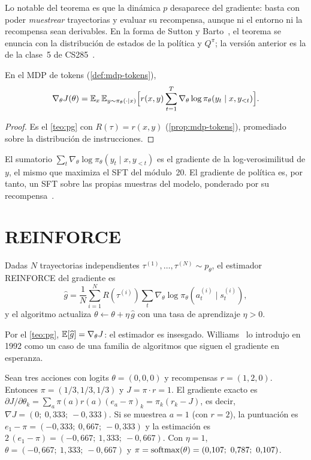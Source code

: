 Lo notable del teorema es que la dinámica $p$ desaparece del gradiente: basta con poder \emph{muestrear} trayectorias y evaluar su recompensa, aunque ni el entorno ni la recompensa sean derivables. En la forma de Sutton y Barto~\cite[§13.2]{sb}, el teorema se enuncia con la distribución de estados de la política y $Q^{\pi}$; la versión anterior es la de la clase~5 de CS285~\cite{cs285}.

\begin{corolario}\label{cor:pg-llm}
En el MDP de tokens (\cref{def:mdp-tokens}),
\[
\nabla_\theta J(\theta)=\mathbb{E}_{x}\,\mathbb{E}_{y\sim\pi_\theta(\cdot\mid x)}\Bigl[r(x,y)\sum_{t=1}^{T}\nabla_\theta\log\pi_\theta(y_t\mid x,y_{<t})\Bigr].
\]
\end{corolario}

\begin{proof}
Es el \cref{teo:pg} con $R(\tau)=r(x,y)$ (\cref{prop:mdp-tokens}), promediado sobre la distribución de instrucciones.
\end{proof}

El sumatorio $\sum_t\nabla_\theta\log\pi_\theta(y_t\mid x,y_{<t})$ es el gradiente de la log-verosimilitud de $y$, el mismo que maximiza el SFT del módulo~20. El gradiente de política es, por tanto, un SFT sobre las propias muestras del modelo, ponderado por su recompensa~\cite{cs336}.

\section{REINFORCE}

\begin{definicion}\label{def:reinforce}
Dadas $N$ trayectorias independientes $\tau^{(1)},\dots,\tau^{(N)}\sim p_\theta$, el estimador REINFORCE del gradiente es
\[
\widehat{g}=\frac1N\sum_{i=1}^{N}R(\tau^{(i)})\sum_{t}\nabla_\theta\log\pi_\theta(a^{(i)}_t\mid s^{(i)}_t),
\]
y el algoritmo actualiza $\theta\leftarrow\theta+\eta\,\widehat{g}$ con una tasa de aprendizaje $\eta>0$.
\end{definicion}

Por el \cref{teo:pg}, $\mathbb{E}[\widehat g]=\nabla_\theta J$: el estimador es insesgado. Williams~\cite{williams} lo introdujo en 1992 como un caso de una familia de algoritmos que siguen el gradiente en esperanza.

\begin{ejemplo}\label{ej:reinforce}
Sean tres acciones con logits $\theta=(0,0,0)$ y recompensas $r=(1,2,0)$. Entonces $\pi=(1/3,1/3,1/3)$ y $J=\pi\cdot r=1$. El gradiente exacto es $\partial J/\partial\theta_k=\sum_a\pi(a)r(a)(e_a-\pi)_k=\pi_k(r_k-J)$, es decir, $\nabla J=(0;\ 0{,}333;\ -0{,}333)$. Si se muestrea $a=1$ (con $r=2$), la puntuación es $e_1-\pi=(-0{,}333;\ 0{,}667;\ -0{,}333)$ y la estimación es $2\,(e_1-\pi)=(-0{,}667;\ 1{,}333;\ -0{,}667)$. Con $\eta=1$, $\theta=(-0{,}667;\ 1{,}333;\ -0{,}667)$ y $\pi=\softmax(\theta)=(0{,}107;\ 0{,}787;\ 0{,}107)$.
\end{ejemplo}

